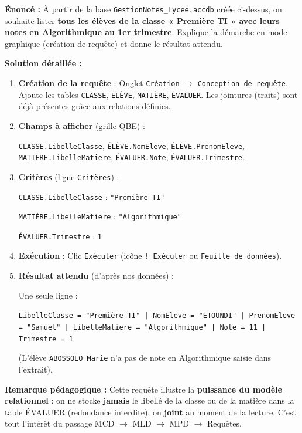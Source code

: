 \documentclass[11pt]{article}
\begin{document}
\begin{exoresolu}
\textbf{Énoncé :} À partir de la base \texttt{GestionNotes\_Lycee.accdb} créée ci-dessus, on souhaite lister \textbf{tous les élèves de la classe « Première TI » avec leurs notes en Algorithmique au 1er trimestre}. Explique la démarche en mode graphique (création de requête) et donne le résultat attendu.\par
\tcblower
\textbf{Solution détaillée :}
\begin{enumerate}
    \item \textbf{Création de la requête} : Onglet \texttt{Création} $\to$ \texttt{Conception de requête}. Ajoute les tables \texttt{CLASSE}, \texttt{ÉLÈVE}, \texttt{MATIÈRE}, \texttt{ÉVALUER}. Les jointures (traits) sont déjà présentes grâce aux relations définies.
    \item \textbf{Champs à afficher} (grille QBE) :\par
    \texttt{CLASSE.LibelleClasse}, \texttt{ÉLÈVE.NomEleve}, \texttt{ÉLÈVE.PrenomEleve}, \texttt{MATIÈRE.LibelleMatiere}, \texttt{ÉVALUER.Note}, \texttt{ÉVALUER.Trimestre}.
    \item \textbf{Critères} (ligne \texttt{Critères}) :\par
    \texttt{CLASSE.LibelleClasse} : \texttt{"Première TI"}\par
    \texttt{MATIÈRE.LibelleMatiere} : \texttt{"Algorithmique"}\par
    \texttt{ÉVALUER.Trimestre} : \texttt{1}
    \item \textbf{Exécution} : Clic \texttt{Exécuter} (icône \texttt{! Exécuter} ou \texttt{Feuille de données}).
    \item \textbf{Résultat attendu} (d'après nos données) :\par
    Une seule ligne :\par
    \texttt{LibelleClasse = "Première TI" | NomEleve = "ETOUNDI" | PrenomEleve = "Samuel" | LibelleMatiere = "Algorithmique" | Note = 11 | Trimestre = 1}\par
    (L'élève \texttt{ABOSSOLO Marie} n'a pas de note en Algorithmique saisie dans l'extrait).
\end{enumerate}
\textbf{Remarque pédagogique :} Cette requête illustre la \textbf{puissance du modèle relationnel} : on ne stocke \textbf{jamais} le libellé de la classe ou de la matière dans la table ÉVALUER (redondance interdite), on \textbf{joint} au moment de la lecture. C'est tout l'intérêt du passage MCD $\to$ MLD $\to$ MPD $\to$ Requêtes.
\end{exoresolu}
\end{document}
